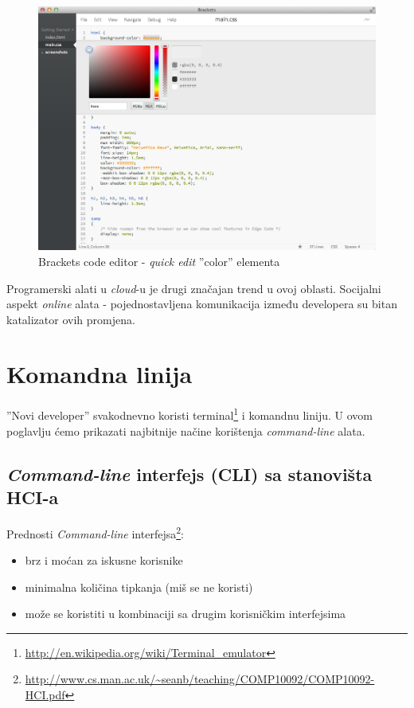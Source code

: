 \documentclass[times, utf8, seminar]{fit}
\begin{document}
\begin{figure}[H]
\centering
\includegraphics[width=12cm]{img/brackets_color_edit.png}
\caption{Brackets code editor - \emph{quick edit} ''color'' elementa}
\end{figure}

Programerski alati u \emph{cloud}-u je drugi značajan trend u ovoj oblasti. Socijalni aspekt \emph{online} alata - pojednostavljena komunikacija između developera su bitan katalizator ovih promjena.

\chapter{Komandna linija}

''Novi developer'' svakodnevno koristi terminal\footnote{\url{http://en.wikipedia.org/wiki/Terminal_emulator}} i komandnu liniju. U ovom poglavlju ćemo prikazati najbitnije načine korištenja \emph{command-line} alata.

\section{\emph{Command-line} interfejs (CLI) sa stanovišta HCI-a}
\label{sec:cli_hci}
Prednosti \emph{Command-line} interfejsa\footnote{\url{http://www.cs.man.ac.uk/~seanb/teaching/COMP10092/COMP10092-HCI.pdf}}:
\begin{itemize}
 \item brz i moćan za iskusne korisnike
 \item minimalna količina tipkanja (miš se ne koristi)
 \item može se koristiti u kombinaciji sa drugim korisničkim interfejsima
\end{itemize}
\end{document}
